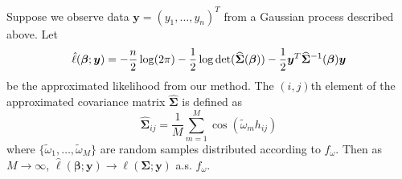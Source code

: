 \begin{theorem}
  Suppose we observe data $\bm{y} = (y_1, \dots, y_n)^T$ from a Gaussian process described above. Let 
  \[
    \hat{\ell}(\bm{\beta}; \bm{y}) = -\frac{n}{2} \log(2\pi) - \frac{1}{2} \log \textnormal{det}(\widehat{\bm{\Sigma}}(\bm{\beta})) - \frac{1}{2} \bm{y}^T \widehat{\bm{\Sigma}}^{-1}(\bm{\beta}) \bm{y}
  \]
  be the approximated likelihood from our method. The $(i,j)$th element of the approximated covariance matrix $\widehat{\bm{\Sigma}}$ is defined as
  \[
    \widehat{\bm{\Sigma}}_{ij} = \frac{1}{M} \sum_{m=1}^M \cos(\widetilde{\omega}_m h_{ij})
  \]
 where $\{\widetilde{\omega}_1, \dots, \widetilde{\omega}_M\}$ are random samples distributed according to $f_\omega$. Then as $M \to \infty$, $\hat{\ell}(\bm{\beta}; \bm{y}) \to \ell(\bm{\Sigma}; \bm{y})$ a.s. $f_\omega$.
\end{theorem}

